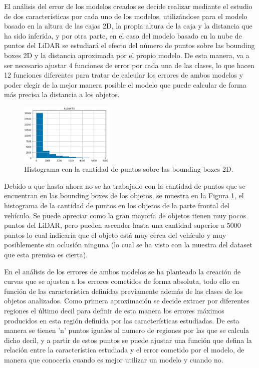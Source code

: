 El análisis del error de los modelos creados se decide realizar mediante el estudio de dos características por cada uno de los modelos, utilizándose para el modelo basado en la altura de las cajas 2D, la propia altura de la caja y la distancia que ha sido inferida, y por otra parte, en el caso del modelo basado en la nube de puntos del \ac{LiDAR} se estudiará el efecto del número de puntos sobre las bounding boxes 2D y la distancia aproximada por el propio modelo. De esta manera, va a ser necesario ajustar 4 funciones de error por cada una de las clases, lo que hacen 12 funciones diferentes para tratar de calcular los errores de ambos modelos y poder elegir de la mejor manera posible el modelo que puede calcular de forma más precisa la distancia a los objetos.

\begin{figure}[H]
    \centering
    \includegraphics[width=0.4\textwidth]{Book/figures/6_approx_distancia/n_points_hist.png}
    \caption{Histograma con la cantidad de puntos sobre las bounding boxes 2D.}
    \label{fig:Histograma con la cantidad de puntos sobre las bounding boxes 2D.}
\end{figure}

Debido a que hasta ahora no se ha trabajado con la cantidad de puntos que se encuentran en las bounding boxes de los objetos, se muestra en la Figura \ref{fig:Histograma con la cantidad de puntos sobre las bounding boxes 2D.}, el histograma de la cantidad de puntos en los objetos de la parte frontal del vehículo. Se puede apreciar como la gran mayoría de objetos tienen muy pocos puntos del \ac{LiDAR}, pero pueden ascender hasta una cantidad superior a 5000 puntos lo cual indicaría que el objeto está muy cerca del vehículo y muy posiblemente sin oclusión ninguna (lo cual se ha visto con la muestra del dataset que esta premisa es cierta).

En el análisis de los errores de ambos modelos se ha planteado la creación de curvas que se ajusten a los errores cometidos de forma absoluta, todo ello en función de las característica definidas previamente además de las clases de los objetos analizados. Como primera aproximación se decide extraer por diferentes regiones el último decil para definir de esta manera los errores máximos producidos en esta región definida por las características estudiadas. De esta manera se tienen 'n' puntos iguales al numero de regiones por las que se calcula dicho decil, y a partir de estos puntos se puede ajustar una función que defina la relación entre la característica estudiada y el error cometido por el modelo, de manera que conocería cuando es mejor utilizar un modelo y cuando no.

